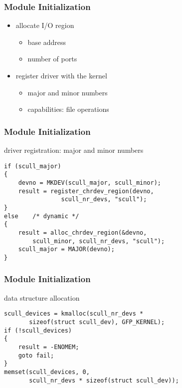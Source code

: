 \documentclass[dvipsnames]{beamer}
\begin{document}
\begin{frame}
  \frametitle{Module Initialization}

  \begin{itemize}
    \item allocate I/O region
    \begin{itemize}
      \item base address
      \item number of ports
    \end{itemize}

    \medskip
    \item register driver with the kernel
    \begin{itemize}
      \item major and minor numbers
      \item capabilities: file operations
    \end{itemize}
  \end{itemize}
\end{frame}

\begin{frame}[fragile]
  \frametitle{Module Initialization}

  \begin{exampleblock}{driver registration: major and minor numbers}
    \begin{lstlisting}
if (scull_major)
{
    devno = MKDEV(scull_major, scull_minor);
    result = register_chrdev_region(devno,
                scull_nr_devs, "scull");
}
else    /* dynamic */
{
    result = alloc_chrdev_region(&devno,
        scull_minor, scull_nr_devs, "scull");
    scull_major = MAJOR(devno);
}
    \end{lstlisting}
  \end{exampleblock}
\end{frame}

\begin{frame}[fragile]
  \frametitle{Module Initialization}

  \begin{exampleblock}{data structure allocation}
    \begin{lstlisting}
scull_devices = kmalloc(scull_nr_devs *
       sizeof(struct scull_dev), GFP_KERNEL);
if (!scull_devices)
{
    result = -ENOMEM;
    goto fail;
}
memset(scull_devices, 0,
       scull_nr_devs * sizeof(struct scull_dev));
    \end{lstlisting}
  \end{exampleblock}
\end{frame}
\end{document}
